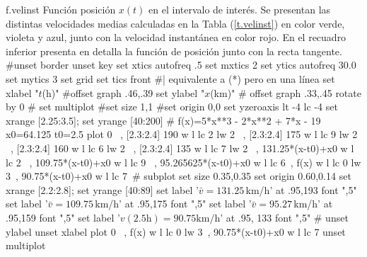 \begin{plot}{0.9}{f.velinst}
  {Función posición $x(t)$ en el intervalo de interés. Se presentan las
  distintas velocidades medias calculadas en la Tabla (\ref{t.velinst}) en color
  verde, violeta y azul, junto con la velocidad instantánea en color rojo. En
  el recuadro inferior presenta en detalla la función de posición junto con la
  recta tangente.}
  #unset border
  unset key
  set xtics autofreq .5
  set mxtics 2
  set ytics autofreq 30.0
  set mytics 3
  set grid
  set tics front    #| equivalente a (*) pero en una línea
  set xlabel "$t$(h)" #offset  graph .46,.39
  set ylabel "$x$(km)" # offset graph .33,.45 rotate by 0
  #
  set multiplot
  #set size 1,1
  #set origin 0,0
  set yzeroaxis lt -4 lc -4
  set xrange [2.25:3.5]; set yrange [40:200]
  #
  f(x)=5*x**3 - 2*x**2 + 7*x - 19
  x0=64.125
  t0=2.5
  plot  0 \
  , [2.3:2.4] 190 w l lc 2 lw 2  \
  , [2.3:2.4] 175 w l lc 9 lw 2  \
  , [2.3:2.4] 160 w l lc 6 lw 2  \
  , [2.3:2.4] 135 w l lc 7 lw 2  \
  , 131.25*(x-t0)+x0 w l lc 2 \
  , 109.75*(x-t0)+x0 w l lc 9 \
  , 95.265625*(x-t0)+x0 w l lc 6\
  , f(x) w l lc 0 lw 3\
  , 90.75*(x-t0)+x0 w l lc 7\
  # subplot
  set size 0.35,0.35
  set origin 0.60,0.14
  set xrange [2.2:2.8]; set yrange [40:89]
  set label '$\bar{v}=131.25\,$km/h' at .95,193 font ",5"
  set label '$\bar{v}=109.75\,$km/h' at .95,175 font ",5"
  set label '$\bar{v}=95.27\,$km/h' at .95,159 font ",5"
  set label '$v(2.5\text{h})=90.75\text{km/h}$' at .95, 133 font ",5"
  #
  unset ylabel
  unset xlabel
  plot  0 \
  , f(x) w l lc 0 lw 3\
  , 90.75*(x-t0)+x0 w l lc 7
  unset multiplot
\end{plot}

